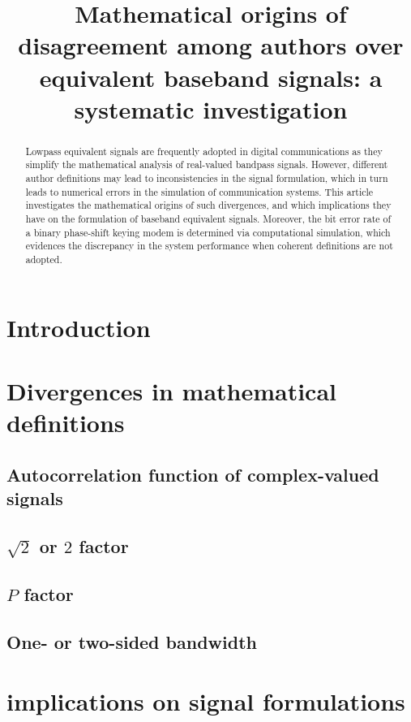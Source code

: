 \documentclass[twocolumn]{article}
\begin{document}
\title{Mathematical origins of disagreement among authors over equivalent baseband signals: a systematic investigation}
\maketitle

\begin{abstract}
    Lowpass equivalent signals are frequently adopted in digital communications as they simplify the mathematical analysis of real-valued bandpass signals.  However, different author definitions may lead to inconsistencies in the signal formulation, which in turn leads to numerical errors in the simulation of communication systems. This article investigates the mathematical origins of such divergences, and which implications they have on the formulation of baseband equivalent signals. Moreover, the bit error rate of a binary phase-shift keying modem is determined via computational simulation, which evidences the discrepancy in the system performance when coherent definitions are not adopted.
\end{abstract}
\section{Introduction}

\section{Divergences in mathematical definitions}

\subsection{Autocorrelation function of complex-valued signals}

\subsection{\(\sqrt{2}\) or \(2\) factor}

\subsection{\(P\) factor}

\subsection{One- or two-sided bandwidth}

\section{implications on signal formulations}
\end{document}
